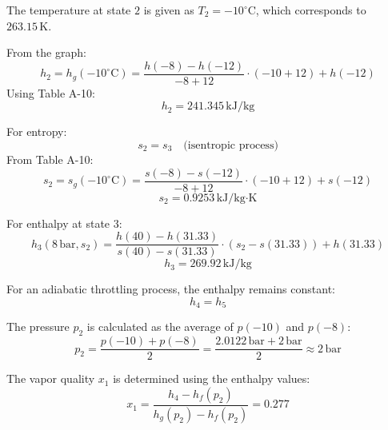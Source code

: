 The temperature at state \( 2 \) is given as \( T_2 = -10^\circ \text{C} \), which corresponds to \( 263.15 \, \text{K} \).  

From the graph:  
\[
h_2 = h_g(-10^\circ \text{C}) = \frac{h(-8) - h(-12)}{-8 + 12} \cdot (-10 + 12) + h(-12)
\]  
Using Table A-10:  
\[
h_2 = 241.345 \, \text{kJ/kg}
\]  

For entropy:  
\[
s_2 = s_3 \quad \text{(isentropic process)}  
\]  
From Table A-10:  
\[
s_2 = s_g(-10^\circ \text{C}) = \frac{s(-8) - s(-12)}{-8 + 12} \cdot (-10 + 12) + s(-12)
\]  
\[
s_2 = 0.9253 \, \text{kJ/kg·K}
\]  

For enthalpy at state \( 3 \):  
\[
h_3(8 \, \text{bar}, s_2) = \frac{h(40) - h(31.33)}{s(40) - s(31.33)} \cdot (s_2 - s(31.33)) + h(31.33)
\]  
\[
h_3 = 269.92 \, \text{kJ/kg}
\]

For an adiabatic throttling process, the enthalpy remains constant:  
\[
h_4 = h_5
\]  

The pressure \( p_2 \) is calculated as the average of \( p(-10) \) and \( p(-8) \):  
\[
p_2 = \frac{p(-10) + p(-8)}{2} = \frac{2.0122 \, \text{bar} + 2 \, \text{bar}}{2} \approx 2 \, \text{bar}
\]  

The vapor quality \( x_1 \) is determined using the enthalpy values:  
\[
x_1 = \frac{h_4 - h_f(p_2)}{h_g(p_2) - h_f(p_2)} = 0.277
\]